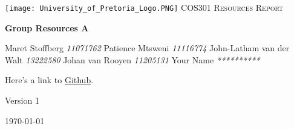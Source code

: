 \begin{titlepage}
\begin{center}
\texttt{[image: University\_of\_Pretoria\_Logo.PNG]}\newline
\textsc{\LARGE COS301 Resources Report}\newline


\textbf{Group Resources A} \\
\begin{flushright} \large
Maret Stoffberg \emph{11071762} \newline
Patience Mtsweni \emph{11116774} \newline
John-Latham van der Walt \emph{13222580} \newline
Johan van Rooyen \emph{11205131} \newline
Your Name \emph{**********} \newline \newline \newline
\end{flushright}
Here's a link to \href{https://github.com/MaretStoffberg/COS301_phase3_ResourcesA}{Github}.


\vfill

{\large Version 1}

{\large \today}

\end{center}
\end{titlepage}
